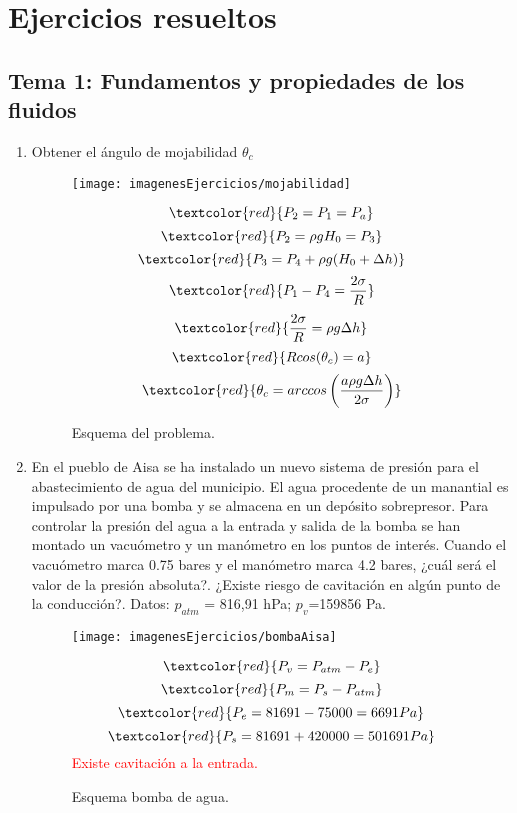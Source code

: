 \section{Ejercicios resueltos}
\subsection{Tema 1: Fundamentos y propiedades de los fluidos}
\begin{enumerate}
	\item Obtener el ángulo de mojabilidad $\theta_c$ 
	\begin{figure}[H]
		\begin{minipage}{0.7\textwidth}
		\centering
		\texttt{[image: imagenesEjercicios/mojabilidad]}
		\caption{Esquema del problema.}
		\label{fig:mojabilidad}
	\end{minipage}%
	\begin{minipage}{0.3\textwidth}
	\[\textcolor{red}{P_2=P_1=P_a}\]
	\[\textcolor{red}{P_2=\rho g H_0=P_3}\]
	\[\textcolor{red}{P_3=P_4+\rho g (H_0+\Delta h)}\]
	\[\textcolor{red}{P_1-P_4=\frac{2\sigma}{R}}\]
	\[\textcolor{red}{\frac{2\sigma}{R}=\rho g \Delta h}\]
	\[\textcolor{red}{Rcos(\theta_c)=a}\]
	\[\textcolor{red}{\theta_c=arccos\left(\frac{a\rho g \Delta h}{2\sigma}\right)}\]
	
	\end{minipage}
	\end{figure}
	
	\item En el pueblo de Aisa se ha instalado un nuevo sistema de presión para el abastecimiento
	de agua del municipio. El agua procedente de un manantial es impulsado por una bomba
	y se almacena en un depósito sobrepresor. Para controlar la presión del agua a la entrada
	y salida de la bomba se han montado un vacuómetro y un manómetro en los puntos de
	interés. Cuando el vacuómetro marca 0.75 bares y el manómetro marca 4.2 bares, ¿cuál
	será el valor de la presión absoluta?. ¿Existe riesgo de cavitación en algún punto de la
	conducción?. Datos: $p_{atm}$ = 816,91 hPa; $p_v$=159856 Pa.
	\begin{figure}[H]
		\begin{minipage}{0.7\textwidth}
		\centering
		\texttt{[image: imagenesEjercicios/bombaAisa]}
		\caption{Esquema bomba de agua.}
		\label{fig:bombaaisa}
	\end{minipage}%
	\begin{minipage}{0.3\textwidth}
	\[\textcolor{red}{P_v=P_{atm}-P_e}\]
	\[\textcolor{red}{P_m=P_s-P_{atm}}\]
\[ \textcolor{red}{P_e=81691-75000=6691 Pa}\]
\[\textcolor{red}{P_s=81691+420000=501691 Pa}\]
\textcolor{red}{Existe cavitación a la entrada.}
	

\end{minipage}
\end{figure}
\end{enumerate}
